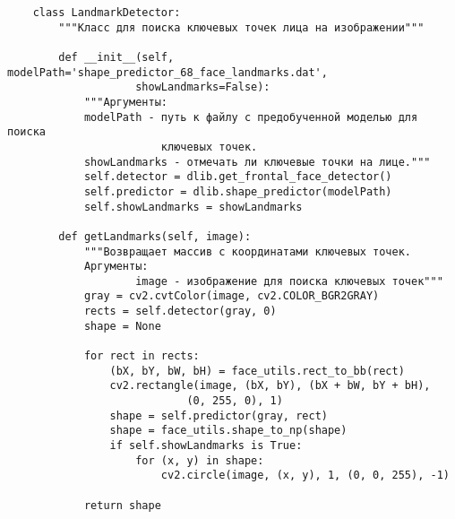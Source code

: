 \begin{verbatim}
    class LandmarkDetector:
        """Класс для поиска ключевых точек лица на изображении"""

        def __init__(self, modelPath='shape_predictor_68_face_landmarks.dat', 
                    showLandmarks=False):
            """Аргументы:
            modelPath - путь к файлу с предобученной моделью для поиска
                        ключевых точек.
            showLandmarks - отмечать ли ключевые точки на лице."""
            self.detector = dlib.get_frontal_face_detector()
            self.predictor = dlib.shape_predictor(modelPath)
            self.showLandmarks = showLandmarks

        def getLandmarks(self, image):
            """Возвращает массив с координатами ключевых точек.
            Аргументы:
                    image - изображение для поиска ключевых точек"""
            gray = cv2.cvtColor(image, cv2.COLOR_BGR2GRAY)
            rects = self.detector(gray, 0)
            shape = None

            for rect in rects:
                (bX, bY, bW, bH) = face_utils.rect_to_bb(rect)
                cv2.rectangle(image, (bX, bY), (bX + bW, bY + bH),
                            (0, 255, 0), 1)
                shape = self.predictor(gray, rect)
                shape = face_utils.shape_to_np(shape)
                if self.showLandmarks is True:
                    for (x, y) in shape:
                        cv2.circle(image, (x, y), 1, (0, 0, 255), -1)

            return shape



\end{verbatim}
